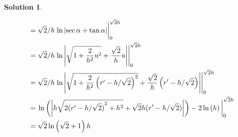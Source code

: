 \documentclass[10pt]{article}
\theoremstyle{definition}
\newtheorem{soln}{Solution}
\newcommand{\primed}[1]{{#1^\prime}}
\begin{document}
\begin{soln}
\begin{enumerate}[label=(\alph*)]
\begin{enumerate}[label=(\roman*)]
\begin{align*}
                     & =\sqrt{2}/h\eval{\ln\abs{\sec\alpha+\tan\alpha}}_{0}^{\sqrt{2}h}                                                                                                       \\
                     & =\sqrt{2}/h\eval{\ln\abs{\sqrt{1+\frac{2}{h^2}u^2}+\frac{\sqrt{2}}{h}u}}_{0}^{\sqrt{2}h}                                                                               \\
                     & =\sqrt{2}/h\eval{\ln\abs{\sqrt{1+\frac{2}{h^2}\left(\primed{r}-h/\sqrt{2}\right)^2}+\frac{\sqrt{2}}{h}\left(\primed{r}-h/\sqrt{2}\right)}}_{0}^{\sqrt{2}h}             \\
                     & =\eval{\ln\left(\left|h\sqrt{2{(\primed{r}-h/\sqrt{2})}^{2}+{h}^{2}}+\sqrt{2}h(\primed{r}-h/\sqrt{2})\right|\right)-2\ln\left(h\right)}_{0}^{\sqrt{2}h} \\
                     & =\sqrt{2}\ln\left(\sqrt{2}+1\right)h
                  \end{align*}
          \end{enumerate}
  \end{enumerate}
\end{soln}
\end{document}
